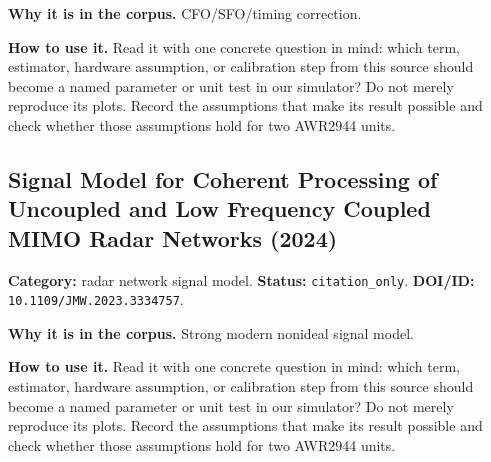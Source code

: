 \documentclass[11pt]{article}
\begin{document}
\textbf{Why it is in the corpus.} CFO/SFO/timing correction.

\textbf{How to use it.} Read it with one concrete question in mind: which term, estimator, hardware assumption, or calibration step from this source should become a named parameter or unit test in our simulator? Do not merely reproduce its plots. Record the assumptions that make its result possible and check whether those assumptions hold for two AWR2944 units.

\subsection*{Signal Model for Coherent Processing of Uncoupled and Low Frequency Coupled MIMO Radar Networks (2024)}
\textbf{Category:} radar network signal model. \textbf{Status:} \nolinkurl{citation_only}. \textbf{DOI/ID:} \nolinkurl{10.1109/JMW.2023.3334757}.

\textbf{Why it is in the corpus.} Strong modern nonideal signal model.

\textbf{How to use it.} Read it with one concrete question in mind: which term, estimator, hardware assumption, or calibration step from this source should become a named parameter or unit test in our simulator? Do not merely reproduce its plots. Record the assumptions that make its result possible and check whether those assumptions hold for two AWR2944 units.
\end{document}
